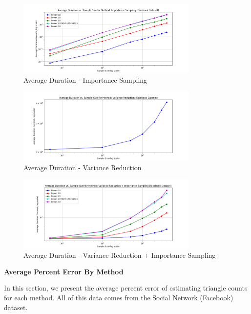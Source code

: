 \documentclass[11pt]{article}
\newcommand{\subsubsubsection}[1]{
  \vspace{1em} %
  \noindent\textbf{#1} %
  \vspace{0.5em} %
}
\begin{document}
\begin{figure}[H]
    \centering
    \includegraphics[width=0.8\textwidth]{plots/durations/avg_duration_Importance Sampling.png}
    \caption{Average Duration - Importance Sampling}
    \label{fig:avg_duration_importance}
\end{figure}

\begin{figure}[H]
    \centering
    \includegraphics[width=0.8\textwidth]{plots/durations/avg_duration_Variance Reduction.png}
    \caption{Average Duration - Variance Reduction}
    \label{fig:avg_duration_variance}
\end{figure}

\begin{figure}[H]
    \centering
    \includegraphics[width=0.8\textwidth]{plots/durations/avg_duration_Variance Reduction + Importance Sampling.png}
    \caption{Average Duration - Variance Reduction + Importance Sampling}
    \label{fig:avg_duration_variance_importance}
\end{figure}

\subsubsubsection{Average Percent Error By Method}

In this section, we present the average percent error of estimating triangle counts for each method.
All of this data comes from the Social Network (Facebook) dataset.
\end{document}
